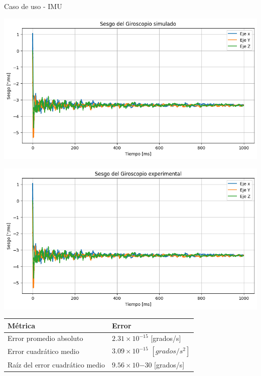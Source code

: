 \documentclass[10pt,aspectratio=169]{beamer} %
\begin{document}
\begin{frame}{Caso de uso - IMU}
  \centering
  \begin{minipage}{0.45\linewidth}
    \centering
    \includegraphics[scale=0.2]{IMU/simulated/sesgo_simulado.png}
  \end{minipage}%
  \hfill
  \begin{minipage}{0.45\linewidth}
    \centering
    \includegraphics[scale=0.2]{IMU/experimental/sesgo_experimental.png}
  \end{minipage}

  \vspace{0.5cm} %

  
    \begin{minipage}{0.9\linewidth} %
      \centering
      \begin{tabular}{ll}
        Métrica                       & Error \\ \hline
        Error promedio absoluto         &   $2.31 \times 10^{-15}$ [grados/s]    \\
        Error cuadrático medio          &   $3.09 \times 10^{-15}$ $[grados/s^{2}]$    \\
        Raíz del error cuadrático medio &   $9.56 \times 10{-30}$ [grados/s]  
        \end{tabular}
    \end{minipage}
\end{frame}
\end{document}
